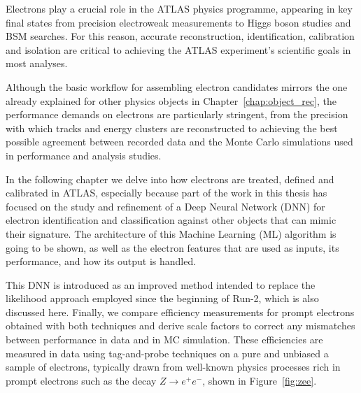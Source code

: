 \usepackage{subcaption}
\usepackage{booktabs}
\usepackage{tabularx}
\newcommand*{\zee}{$Z \to e^{+}e^{-}$\xspace}
\newcommand*{\pt}{$p_{\text{T}}$\xspace}
\newcommand*{\zmass}{$\text{Z}_{\text{mass}}$\xspace}
\newcommand*{\ziso}{$\text{Z}_{\text{iso}}$\xspace}
\newcommand*{\tp}{T$\&$P\xspace}
\newcommand*{\et}{$E_{\text{T}}$\xspace}
\newcommand*{\eta}{$\eta$\xspace}

\setcounter{secnumdepth}{3}

Electrons play a crucial role in the ATLAS physics programme, appearing in key final states from precision electroweak measurements to Higgs boson studies and BSM searches. For this reason, accurate reconstruction, identification, calibration and isolation are critical to achieving the ATLAS experiment’s scientific goals in most analyses.  

Although the basic workflow for assembling electron candidates mirrors the one already explained for other physics objects in Chapter~\ref{chap:object_rec}, the performance demands on electrons are particularly stringent, from the precision with which tracks and energy clusters are reconstructed to achieving the best possible agreement between recorded data and the Monte Carlo simulations used in performance and analysis studies.  

In the following chapter we delve into how electrons are treated, defined and calibrated in ATLAS, especially because part of the work in this thesis has focused on the study and refinement of a Deep Neural Network (DNN) for electron identification and classification against other objects that can mimic their signature.  The architecture of this Machine Learning (ML) algorithm is going to be shown, as well as the electron features that are used as inputs, its performance, and how its output is handled. 

This DNN is introduced as an improved method intended to replace the likelihood approach employed since the beginning of Run-2, which is also discussed here.  Finally, we compare efficiency measurements for prompt electrons obtained with both techniques and derive scale factors to correct any mismatches between performance in data and in MC simulation.  These efficiencies are measured in data using tag-and-probe techniques on a pure and unbiased a sample of electrons, typically drawn from well-known physics processes rich in prompt electrons such as the decay $Z\to e^+e^-$, shown in Figure~\ref{fig:zee}.

